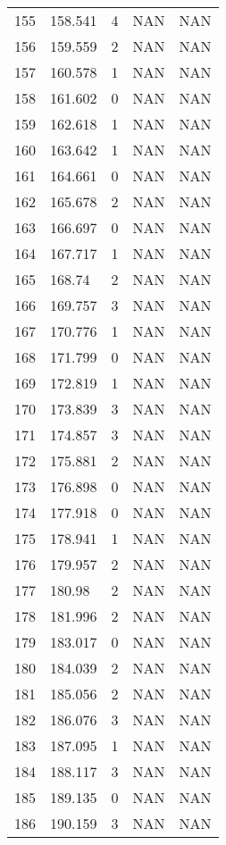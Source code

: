 \documentclass{article}
\begin{document}
\begin{longtable}{@{}lllll@{}}
				155 & 158.541 & 4    & NAN  & NAN  \\
				156 & 159.559 & 2    & NAN  & NAN  \\
				157 & 160.578 & 1    & NAN  & NAN  \\
				158 & 161.602 & 0    & NAN  & NAN  \\
				159 & 162.618 & 1    & NAN  & NAN  \\
				160 & 163.642 & 1    & NAN  & NAN  \\
				161 & 164.661 & 0    & NAN  & NAN  \\
				162 & 165.678 & 2    & NAN  & NAN  \\
				163 & 166.697 & 0    & NAN  & NAN  \\
				164 & 167.717 & 1    & NAN  & NAN  \\
				165 & 168.74  & 2    & NAN  & NAN  \\
				166 & 169.757 & 3    & NAN  & NAN  \\
				167 & 170.776 & 1    & NAN  & NAN  \\
				168 & 171.799 & 0    & NAN  & NAN  \\
				169 & 172.819 & 1    & NAN  & NAN  \\
				170 & 173.839 & 3    & NAN  & NAN  \\
				171 & 174.857 & 3    & NAN  & NAN  \\
				172 & 175.881 & 2    & NAN  & NAN  \\
				173 & 176.898 & 0    & NAN  & NAN  \\
				174 & 177.918 & 0    & NAN  & NAN  \\
				175 & 178.941 & 1    & NAN  & NAN  \\
				176 & 179.957 & 2    & NAN  & NAN  \\
				177 & 180.98  & 2    & NAN  & NAN  \\
				178 & 181.996 & 2    & NAN  & NAN  \\
				179 & 183.017 & 0    & NAN  & NAN  \\
				180 & 184.039 & 2    & NAN  & NAN  \\
				181 & 185.056 & 2    & NAN  & NAN  \\
				182 & 186.076 & 3    & NAN  & NAN  \\
				183 & 187.095 & 1    & NAN  & NAN  \\
				184 & 188.117 & 3    & NAN  & NAN  \\
				185 & 189.135 & 0    & NAN  & NAN  \\
				186 & 190.159 & 3    & NAN  & NAN  \\

\end{longtable}
\end{document}
